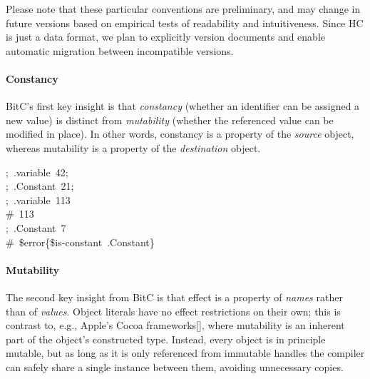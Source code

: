 \documentclass[preprint]{{acmart}}
\begin{document}
\noindent{}Please note that these particular conventions are preliminary, and may
change in future versions based on empirical tests of readability and
intuitiveness. Since HC is just a data format, we plan to explicitly
version documents and enable automatic migration between incompatible versions.%

\paragraph{Constancy}\label{sec-constancy}%

\noindent{}BitC's first key insight is that \emph{constancy} (whether an identifier can be
assigned a new value) is distinct from \emph{mutability} (whether the
referenced value can be modified in place). In other words, constancy is
a property of the \emph{source} object, whereas mutability is a property of the
\emph{destination} object.%
\begin{mdpre}%
\noindent;~.variable~{42};\\
;~.{Constant}~{21};\\
;~.variable~{113}\\
{\#~113}\\
;~.{Constant}~7\\
{\#~\$error\{\$is-constant~.Constant\}}%
\end{mdpre}
\paragraph{Mutability}\label{sec-mutability}%

\noindent{}The second key insight from BitC is that effect is a property of
\emph{names} rather than of \emph{values}. Object literals have no effect
restrictions on their own; this is contrast to, e.g., Apple's Cocoa
frameworks[], where mutability is an inherent part of the object's
constructed type. Instead, every object is in principle mutable, but as
long as it is only referenced from immutable handles the compiler can
safely share a single instance between them, avoiding unnecessary copies.%
\end{document}
